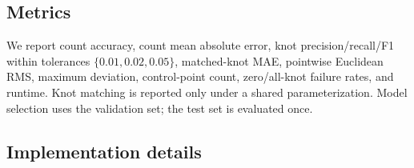 \subsection{Metrics}

We report count accuracy, count mean absolute error, knot precision/recall/F1
within tolerances $\{0.01,0.02,0.05\}$, matched-knot MAE, pointwise Euclidean
RMS, maximum deviation, control-point count, zero/all-knot failure rates, and
runtime. Knot matching is reported only under a shared parameterization. Model
selection uses the validation set; the test set is evaluated once.

\subsection{Implementation details}


